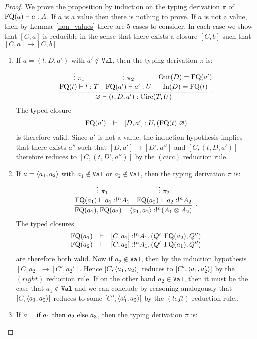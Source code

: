 \documentclass[twoside]{article}
\begin{document}
\begin{proof}
We prove the proposition by induction on the typing derivation $\pi$ of 
$\mathop{\textrm{FQ}}\nolimits(a)\vdash a:A$. If $a$ is a value then there is nothing 
to prove. If $a$ is not a value, then by 
Lemma~\hyperref[non_values]{\ref*{non_values}} there are 5 cases to consider. 
In each case we show that $[C,a]$ is reducible in the sense that there exists a 
closure  $[C,b]$ such that $[C,a]\to[C,b]$
\begin{enumerate}
  \item If $a=(t,D,a')$ with $a'\notin \mathtt{Val}$, then the typing derivation 
  $\pi$ is:
  \[
  \infer[.]{\varnothing\entails (t,D,a'):\Circ(T,U)}{
    \deduce[]{\FQ(t)\entails t:T}{
      \vdots ~\pi_1
    }
    &
    \deduce[]{\FQ(a')\entails a':U}{
      \vdots ~\pi_2     
    }
    &
    \deduce[]{\In(D)=\FQ(t)}{
      \Out(D)=\FQ(a')
    }
  }   
  \]
  The typed closure 
  \[
  \begin{array}{rcl}
  \mathop{\textrm{FQ}}\nolimits(a') & \vdash & [D,a']:U,(\mathop{\textrm{FQ}}\nolimits(t)|\varnothing)
  \end{array}
  \]
  is therefore valid. Since $a'$ 
  is not a value, the induction hypothesis implies that there exists $a''$ such 
  that $[D,a']\to [D',a'']$ and $[C,(t,D,a')]$ therefore reduces to 
  $[C,(t,D',a'')]$ by the $(circ)$ reduction rule.
  \item If $a=\langle a_1,a_2\rangle$ with $a_1\notin \mathtt{Val}$ or $a_2\notin \mathtt{Val}$,
  then the typing derivation $\pi$ is:
  \[
  \infer[.]{\FQ(a_1),\FQ(a_2)\entails \p{a_1,a_2}:!^n(A_1\x A_2)}{
    \deduce[]{\FQ(a_1)\entails a_1:!^nA_1}{
      \vdots~\pi_1
    }
    & 
    \deduce[]{\FQ(a_2)\entails a_2:!^nA_2}{
      \vdots~\pi_2
    }
  }
  \] 
  The typed closures 
  \[
  \begin{array}{rcl}
  \mathop{\textrm{FQ}}\nolimits(a_1) & \vdash & [C,a_1]:!^nA_1,(Q'|\mathop{\textrm{FQ}}\nolimits(a_2),Q'')\\
  \mathop{\textrm{FQ}}\nolimits(a_2) & \vdash & [C,a_2]:!^nA_1, (Q'|\mathop{\textrm{FQ}}\nolimits(a_1),Q'')
  \end{array}
  \]
  are therefore both valid. 
  Now if $a_2\notin\mathtt{Val}$, then by the induction hypothesis 
  $[C,a_2]\to[C',a_2']$. Hence $[C,\langle a_1,a_2\rangle]$ reduces to $[C',\langle a_1,a_2'\rangle]$ 
  by the $(right)$ reduction rule.
  If on the other hand $a_2\in\mathtt{Val}$, then it must be the case that $a_1\notin\mathtt{Val}$ 
  and we can conclude by reasoning analogously that $[C,\langle a_1,a_2\rangle]$ reduces to 
  some $[C',\langle a_1',a_2\rangle]$ by the $(left)$ reduction rule.. 
  \item If $a=\text{if}~ a_1 ~\text{then}~ a_2 ~\text{else}~ a_3$, then the typing derivation $\pi$ is:

\end{enumerate}
\end{proof}
\end{document}
